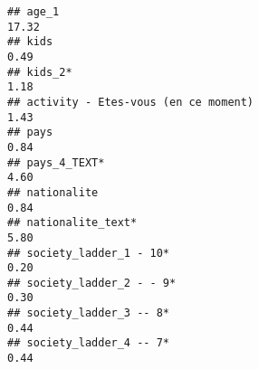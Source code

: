 \documentclass[
]{article}
\begin{document}
\begin{verbatim}
## age_1                                                                                                                                                                                                                        17.32
## kids                                                                                                                                                                                                                          0.49
## kids_2*                                                                                                                                                                                                                       1.18
## activity - Etes-vous (en ce moment)                                                                                                                                                                                           1.43
## pays                                                                                                                                                                                                                          0.84
## pays_4_TEXT*                                                                                                                                                                                                                  4.60
## nationalite                                                                                                                                                                                                                   0.84
## nationalite_text*                                                                                                                                                                                                             5.80
## society_ladder_1 - 10*                                                                                                                                                                                                        0.20
## society_ladder_2 - - 9*                                                                                                                                                                                                       0.30
## society_ladder_3 -- 8*                                                                                                                                                                                                        0.44
## society_ladder_4 -- 7*                                                                                                                                                                                                        0.44

\end{verbatim}
\end{document}
